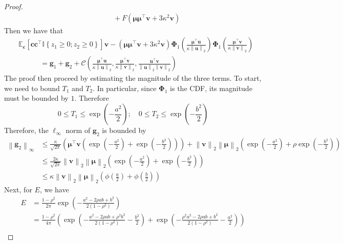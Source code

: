 \documentclass[10pt,a4paper]{amsart}
\def\bfc{{\mathbf{c}}}\def\bfd{{\mathbf{d}}}
\def\bfg{{\mathbf{g}}}\def\bfh{{\mathbf{h}}}
\def\bfu{{\mathbf{u}}}\def\bfv{{\mathbf{v}}}\def\bfw{{\mathbf{w}}}\def\bfx{{\mathbf{x}}}
\def\bfv{{\mathbf{v}}}\def\bfw{{\mathbf{w}}}\def\bfx{{\mathbf{x}}}
\newcommand{\indy}[1]{\mathbb{I}\left\{#1\right\}}
\newcommand{\norm}[1]{\left\|#1\right\|}
\newcommand{\paren}[1]{\left(#1\right)}
\providecommand{\E}{\mathbb{E}}
\begin{document}
\begin{proof}
\begin{equation}
\begin{aligned}
            & \quad\quad\quad + F\paren{\bm{\mu}\bm{\mu}^\top\bfv + 3\kappa^2\bfv}
        \end{aligned}
    \end{equation}
    Then we have that
    \begin{equation}
        \label{eq:exp_mat_vec_diff}
        \begin{aligned}
             & \E_{\bfc}\left[\bfc\bfc^\top\indy{z_1\geq 0;z_2\geq 0}\right]\bfv - \paren{\bm{\mu}\bm{\mu}^\top\bfv + 3\kappa^2\bfv}\bm{\Phi}_1\paren{\frac{\bm{\mu}^\top\bfu}{\kappa\norm{\bfu}_2}}\bm{\Phi}_1\paren{\frac{\bm{\mu}^\top\bfv}{\kappa\norm{\bfv}_2}} \\
             & \quad\quad\quad = \bfg_1 + \bfg_2 + \mathcal{C}\paren{\frac{\bm{\mu}^\top\bfu}{\kappa\norm{\bfu}_2}, \frac{\bm{\mu}^\top\bfv}{\kappa\norm{\bfv}_2}, \frac{\bfu^\top\bfv}{\norm{\bfu}_2\norm{\bfv}_2}}
        \end{aligned}
    \end{equation}
    The proof then proceed by estimating the magnitude of the three terms. To start, we need to bound $T_1$ and $T_2$. In particular, since $\bm{\Phi}_1$ is the CDF, its magnitude must be bounded by $1$. Therefore
    \[
        0\leq T_1 \leq \exp\paren{-\frac{a^2}{2}};\quad 0\leq T_2 \leq \exp\paren{-\frac{b^2}{2}}
    \]
    Therefore, the $\ell_{\infty}$ norm of $\bfg_2$ is bounded by
    \begin{equation}
        \label{eq:g2_bound}
        \begin{aligned}
            \norm{\bfg_2}_{\infty} & \leq \frac{\kappa}{\sqrt{2\pi}}\paren{\bm{\mu}^\top\bfv\paren{\exp\paren{-\frac{a^2}{2}} + \exp\paren{-\frac{b^2}{2}}}} + \norm{\bfv}_2\norm{\bm\mu}_2\paren{\exp\paren{-\frac{a^2}{2}} + \rho\exp\paren{-\frac{b^2}{2}}}\\
            & \leq \frac{2\kappa}{\sqrt{2\pi}}\norm{\bfv}_2\norm{\bm{\mu}}_2\paren{\exp\paren{-\frac{a^2}{2}} + \exp\paren{-\frac{b^2}{2}}}\\
            & \leq \kappa\norm{\bfv}_2\norm{\bm{\mu}}_2\paren{\phi\paren{\frac{a}{2}} + \phi\paren{\frac{b}{2}}}
        \end{aligned}
    \end{equation}
    Next, for $E$, we have
    \begin{align*}
        E & = \frac{1-\rho^2}{2\pi}\exp\paren{-\frac{a^2 - 2\rho ab + b^2}{2\paren{1-\rho^2}}}\\
        & =\frac{1-\rho^2}{4\pi}\paren{\exp\paren{-\frac{a^2 - 2\rho ab + \rho^2b^2}{2\paren{1-\rho^2}} - \frac{b^2}{2}} + \exp\paren{-\frac{\rho^2a^2 - 2\rho ab + b^2}{2\paren{1-\rho^2}} - \frac{a^2}{2}}}\\

\end{align*}
\end{proof}
\end{document}
